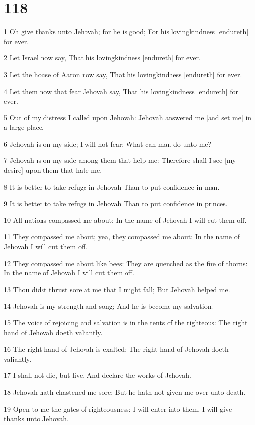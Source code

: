 \chapter{118}

\par 1 Oh give thanks unto Jehovah; for he is good; For his lovingkindness [endureth] for ever.
\par 2 Let Israel now say, That his lovingkindness [endureth] for ever.
\par 3 Let the house of Aaron now say, That his lovingkindness [endureth] for ever.
\par 4 Let them now that fear Jehovah say, That his lovingkindness [endureth] for ever.
\par 5 Out of my distress I called upon Jehovah: Jehovah answered me [and set me] in a large place.
\par 6 Jehovah is on my side; I will not fear: What can man do unto me?
\par 7 Jehovah is on my side among them that help me: Therefore shall I see [my desire] upon them that hate me.
\par 8 It is better to take refuge in Jehovah Than to put confidence in man.
\par 9 It is better to take refuge in Jehovah Than to put confidence in princes.
\par 10 All nations compassed me about: In the name of Jehovah I will cut them off.
\par 11 They compassed me about; yea, they compassed me about: In the name of Jehovah I will cut them off.
\par 12 They compassed me about like bees; They are quenched as the fire of thorns: In the name of Jehovah I will cut them off.
\par 13 Thou didst thrust sore at me that I might fall; But Jehovah helped me.
\par 14 Jehovah is my strength and song; And he is become my salvation.
\par 15 The voice of rejoicing and salvation is in the tents of the righteous: The right hand of Jehovah doeth valiantly.
\par 16 The right hand of Jehovah is exalted: The right hand of Jehovah doeth valiantly.
\par 17 I shall not die, but live, And declare the works of Jehovah.
\par 18 Jehovah hath chastened me sore; But he hath not given me over unto death.
\par 19 Open to me the gates of righteousness: I will enter into them, I will give thanks unto Jehovah.
